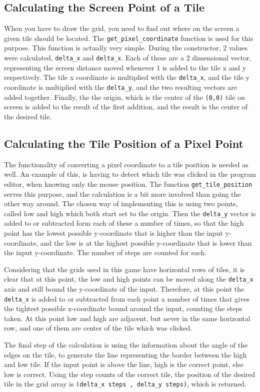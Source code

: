 \subsection{Calculating the Screen Point of a Tile}
When you have to draw the grid, you need to find out where on the screen a given tile should be located. The \texttt{get\_pixel\_coordinate} function is used for this purpose. This function is actually very simple. During the constructor, 2 values were calculated, \texttt{delta\_x} and \texttt{delta\_x}. Each of these are a 2 dimensional vector, representing the screen distance moved whenever 1 is added to the tile x and y respectively. The tile x coordinate is multiplied with the \texttt{delta\_x}, and the tile y coordinate is multiplied with the \texttt{delta\_y}, and the two resulting vectors are added together. Finally, the the origin, which is the center of the \texttt{(0,0)} tile on screen is added to the result of the first addition, and the result is the center of the desired tile.

\subsection{Calculating the Tile Position of a Pixel Point}
The functionality of converting a pixel coordinate to a tile position is needed as well. An example of this, is having to detect which tile was clicked in the program editor, when knowing only the mouse position. The function \texttt{get\_tile\_position} serves this purpose, and the calculation is a bit more involved than going the other way around. The chosen way of implementing this is using two points, called low and high which both start set to the origin. Then the \texttt{delta\_y} vector is added to or subtracted form each of these a number of times, so that the high point has the lowest possible y-coordinate that is higher than the input y-coordinate, and the low is at the highest possible y-coordinate that is lower than the input y-coordinate. The number of steps are counted for each.

Considering that the grids used in this game have horizontal rows of tiles, it is clear that at this point, the low and high points can be moved along the \texttt{delta\_x} axis and still bound the y-coordinate of the input. Therefore, at this point the \texttt{delta\_x} is added to or subtracted from each point a number of times that gives the tightest possible x-coordinate bound around the input, counting the steps taken. At this point low and high are adjacent, but never in the same horizontal row, and one of them are center of the tile which was clicked.

The final step of the calculation is using the information about the angle of the edges on the tile, to generate the line representing the border between the high and low tile. If the input point is above the line, high is the correct point, else low is correct. Using the step counts of the correct tile, the position of the desired tile in the grid array is \texttt{(delta\_x steps , delta\_y steps)}, which is returned.